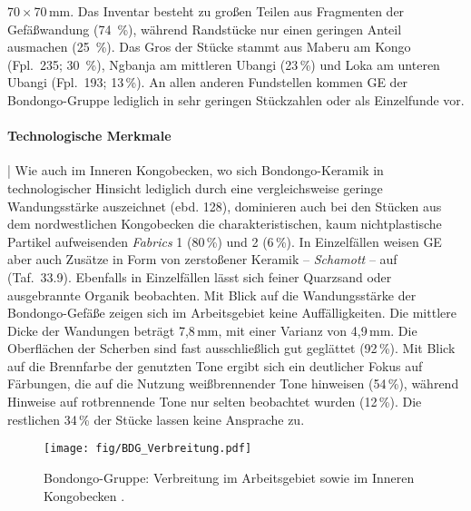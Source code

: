 70\,$\times$\,70\,mm. Das Inventar besteht zu großen Teilen aus Fragmenten der Gefäßwandung (74~\%), während Randstücke nur einen geringen Anteil ausmachen (25~\%). Das Gros der Stücke stammt aus Maberu am Kongo (Fpl.~235; 30~\%), \mbox{Ngbanja} am mittleren \mbox{Ubangi} (23\,\%) und Loka am unteren \mbox{Ubangi} (Fpl.~193; 13\,\%). An allen anderen Fundstellen kommen GE der Bondongo-Gruppe lediglich in sehr geringen Stückzahlen oder als Einzelfunde vor. 

\paragraph{Technologische Merkmale}\hspace{-.5em}|\hspace{.5em}%
Wie auch im Inneren Kongobecken, wo sich Bondongo-Keramik in technologischer Hinsicht lediglich durch eine vergleichsweise geringe Wandungsstärke auszeichnet (ebd. 128), dominieren auch bei den Stücken aus dem nordwestlichen Kongobecken die charakteristischen, kaum nichtplastische Partikel aufweisenden \textit{Fabrics} 1 (80\,\%) und 2 (6\,\%). In Einzelfällen weisen GE aber auch Zusätze in Form von zerstoßener Keramik -- \textit{Schamott} -- auf (Taf.~33.9). Ebenfalls in Einzelfällen lässt sich feiner Quarzsand oder ausgebrannte Organik beobachten. Mit Blick auf die Wandungsstärke der Bondongo-Gefäße zeigen sich im Arbeitsgebiet keine Auffälligkeiten. Die mittlere Dicke der Wandungen beträgt 7,8\,mm, mit einer Varianz von 4,9\,mm. Die Oberflächen der Scherben sind fast ausschließlich gut geglättet (92\,\%). Mit Blick auf die Brennfarbe der genutzten Tone ergibt sich ein deutlicher Fokus auf Färbungen, die auf die Nutzung weißbrennender Tone hinweisen (54\,\%), während Hinweise auf rotbrennende Tone nur selten beobachtet wurden (12\,\%). Die restlichen 34\,\% der Stücke lassen keine Ansprache zu. 

\begin{figure*}[p]
	\centering
	\texttt{[image: fig/BDG\_Verbreitung.pdf]}
	\caption{Bondongo-Gruppe: Verbreitung im Arbeitsgebiet sowie im Inneren Kongobecken \parencite[grau nach][562--563 Karte 11]{Wotzka.1995}.}
	\label{fig:BDG_Verbreitung}
\end{figure*}


